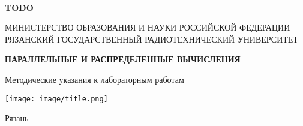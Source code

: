 
\begin{titlepage}

\begin{center}

~
\vspace{0.25cm}

\begin{flushright}

	{\large \bf TODO}

\end{flushright}

\bigskip

{\scriptsize МИНИСТЕРСТВО ОБРАЗОВАНИЯ И НАУКИ РОССИЙСКОЙ ФЕДЕРАЦИИ \\ РЯЗАНСКИЙ ГОСУДАРСТВЕННЫЙ РАДИОТЕХНИЧЕСКИЙ УНИВЕРСИТЕТ}

\vspace{2.5cm}

{\large \bf ПАРАЛЛЕЛЬНЫЕ И РАСПРЕДЕЛЕННЫЕ ВЫЧИСЛЕНИЯ}

\bigskip

Методические указания к лабораторным работам

\vspace{2.1cm}

\texttt{[image: image/title.png]}

\vspace{2.5cm}

Рязань \the\year

\end{center}

\end{titlepage}

\clearpage

